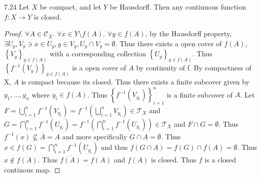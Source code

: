 \documentclass{article}
\newcommand*{\T}{\mathcal{T}}
\newcommand*{\subeq}{\subseteq}
\newcommand*{\empset}{\emptyset}
\begin{document}
\bigskip

\begin{claim}{7.24}\label{Claim 7.24.}
    Let $X$ be compact, and let $Y$ be Hausdorff. Then any continuous function $f: X \to Y$ is closed.
\end{claim}
\begin{proof}
    $\forall A \in \mathcal{C}_X$. $\forall x \in Y \setminus f(A)$. $\forall y \in f(A)$, by the Hausdorff property, $\exists U_y, V_y \ni x \in U_y, y \in V_y, U_y \cap V_y = \empset$. Thus there exists a open cover of $f(A)$, $\left\{ V_y \right\}_{y \in f(A)}$ with a corresponding collection $\left\{ U_y \right\}_{y \in f(A)}$. Thus $\left\{ f^{-1}(V_y) \right\}_{y \in f(A)}$ is a open cover of $A$ by continuity of f. By compactness of X, $A$ is compact because its closed. Thus there exists a finite subcover given by $y_1, \dots, y_n$ where $y_i \in f(A)$. Thus $\left\{ f^{-1}(V_{y_i}) \right\}_{i = 1}^n$ is a finite subcover of $A$. Let $F = \bigcup_{i = 1}^n f^{-1}(V_{y_i}) = f^{-1}\left(\bigcup_{i = 1}^n V_{y_i}\right) \in \T_X$ and $G = \bigcap_{i = 1}^n f^{-1}(U_{y_i}) = f^{-1}(\bigcap_{i = 1}^n f^{-1}(U_{y_i})) \in \T_X$ and $F \cap G = \empset$. Thus $f^{-1}(x) \not \subeq \overline{A} = A$ and more specifically $G \cap A = \empset$. Thus $x \in f(G) = \bigcap_{i = 1}^n f^{-1}(U_{y_i})$ and thus $f(G \cap A) = f(G) \cap f(A) = \empset$. Thus $x \not \in \overline{f(A)}$. Thus $\overline{f(A)} = f(A)$ and $f(A)$ is closed. Thus $f$ is a closed continous map.                                  
\end{proof}

\bigskip
\end{document}
